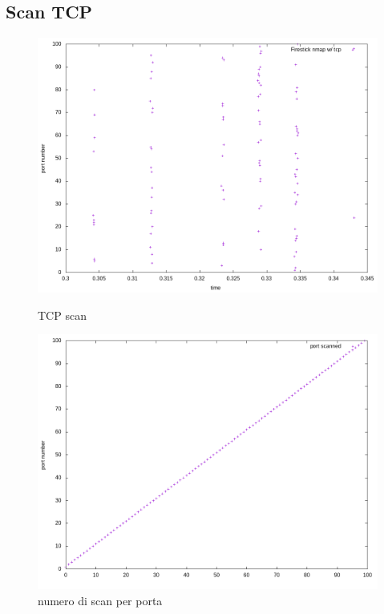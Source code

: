\documentclass{article}
\begin{document}
\subsection{Scan TCP}
\begin{figure}[!htb]
  \begin{minipage}{0.49\textwidth}
    \centering
    \includegraphics[width=1\linewidth]{firestick_tcp.png}
    \vspace{-5pt}
    \caption{TCP scan}\label{Fig:tcp3}
  \end{minipage}\hfill
  \begin{minipage}{0.49\textwidth}
    \centering
    \includegraphics[width=1\linewidth]{Firestick_tcp_num_test.png}
    \vspace{-5pt}
    \caption{numero di scan per porta}\label{Fig:num3}
  \end{minipage}
\end{figure}
\end{document}
